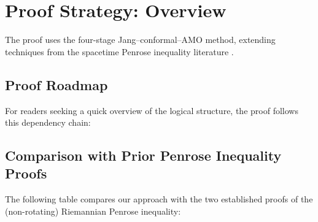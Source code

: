 \section{Proof Strategy: Overview}\label{sec:proof-outline}

The proof uses the four-stage Jang--conformal--AMO method, extending techniques from the spacetime Penrose inequality literature \cite{braykhuri2010, hankhuri2013, amo2022}. 

\subsection{Proof Roadmap}\label{subsec:proof-roadmap}

For readers seeking a quick overview of the logical structure, the proof follows this dependency chain:

\begin{center}
\end{center}

\subsection{Comparison with Prior Penrose Inequality Proofs}

The following table compares our approach with the two established proofs of the (non-rotating) Riemannian Penrose inequality:

